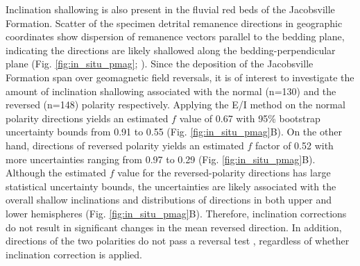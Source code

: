 \documentclass[draft]{agujournal2019}
\begin{document}
Inclination shallowing is also present in the fluvial red beds of the Jacobsville Formation. Scatter of the specimen detrital remanence directions in geographic coordinates show dispersion of remanence vectors parallel to the bedding plane, indicating the directions are likely shallowed along the bedding-perpendicular plane (Fig. \ref{fig:in_situ_pmag}; ). Since the deposition of the Jacobsville Formation span over geomagnetic field reversals, it is of interest to investigate the amount of inclination shallowing associated with the normal (n=130) and the reversed (n=148) polarity respectively. Applying the E/I method on the normal polarity directions yields an estimated $f$ value of 0.67 with 95\% bootstrap uncertainty bounds from 0.91 to 0.55 (Fig. \ref{fig:in_situ_pmag}B). On the other hand, directions of reversed polarity yields an estimated $f$ factor of 0.52 with more uncertainties ranging from 0.97 to 0.29 (Fig. \ref{fig:in_situ_pmag}B). Although the estimated $f$ value for the reversed-polarity directions has large statistical uncertainty bounds, the uncertainties are likely associated with the overall shallow inclinations and distributions of directions in both upper and lower hemispheres (Fig. \ref{fig:in_situ_pmag}B). Therefore, inclination corrections do not result in significant changes in the mean reversed direction. In addition, directions of the two polarities do not pass a reversal test \cite{McFadden1990a, Tauxe2010a}, regardless of whether inclination correction is applied. 
\end{document}
